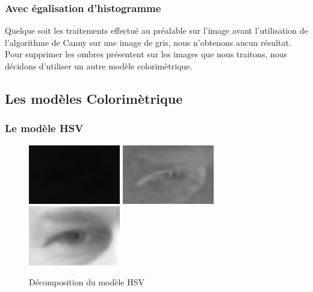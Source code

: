 \subsubsection{Avec égalisation d'histogramme}

Quelque soit les traitements effectué au préalable sur l'image avant l'utilisation de l'algorithme de Canny
sur une image de gris, nous n'obtenons aucun résultat. Pour supprimer les ombres présentent sur les images
que nous traitons, nous décidons d'utiliser un autre modèle colorimètrique.

\subsection{Les modèles Colorimètrique}
\subsubsection{Le modèle HSV}

\begin{figure}[H]
 \center
 \includegraphics[width=4cm]{image/hue.png}
 \includegraphics[width=4cm]{image/saturation.png}
 \includegraphics[width=4cm]{image/value.png}
 \caption{Décomposition du modèle HSV}
\end{figure}

